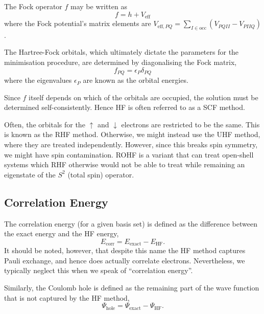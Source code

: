 The Fock operator $f$ may be written as
\begin{equation}
    f = h + V_\mathrm{eff}
\end{equation}
where the Fock potential's matrix elements are $V_{\mathrm{eff},PQ}=\sum_{I\in\mathrm{occ}}(V_{PQII}-V_{PIIQ})$.

The Hartree-Fock orbitals, which ultimately dictate the parameters for the minimisation procedure, are determined by diagonalising the Fock matrix,
\begin{equation}
    f_{PQ} = \epsilon_P\delta_{PQ}
\end{equation}
where the eigenvalues $\epsilon_P$ are known as the orbital energies.

Since $f$ itself depends on which of the orbitals are occupied, the solution must be determined self-consistently. Hence \gls{HF} is often referred to as a \gls{SCF} method.

Often, the orbitals for the $\uparrow$ and $\downarrow$ electrons are restricted to be the same. This is known as the \gls{RHF} method. Otherwise, we might instead use the \gls{UHF} method, where they are treated independently. However, since this breaks spin symmetry, we might have spin contamination. \gls{ROHF} is a variant that can treat open-shell systems which \gls{RHF} otherwise would not be able to treat while remaining an eigenstate of the $S^2$ (total spin) operator.

\subsection{Correlation Energy}

The correlation energy (for a given basis set) is defined as the difference between the exact energy and the \gls{HF} energy,
\begin{equation}
E_\mathrm{corr} = E_\mathrm{exact} - E_\mathrm{HF}.
\end{equation}
It should be noted, however, that despite this name the \gls{HF} method captures Pauli exchange, and hence does actually correlate electrons. Nevertheless, we typically neglect this when we speak of ``correlation energy''.

Similarly, the Coulomb hole is defined as the remaining part of the wave function that is not captured by the \gls{HF} method,
\begin{equation}
    \Psi_\mathrm{hole} = \Psi_\mathrm{exact} - \Psi_\mathrm{HF}.
\end{equation}

